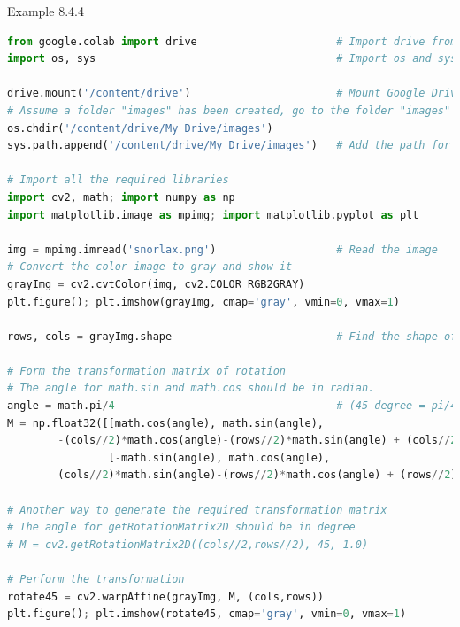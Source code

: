 \documentclass{book}
\begin{document}
\begin{egBox}{Example 8.4.4}{}
    \raggedright
    \begin{lstlisting}[language=Python, basicstyle=\ttfamily\small, keywordstyle=\color{blue}, commentstyle=\color{forestgreen}, stringstyle=\color{red}, showstringspaces=false]
from google.colab import drive                      # Import drive from google.colab package
import os, sys                                      # Import os and sys modules

drive.mount('/content/drive')                       # Mount Google Drive
# Assume a folder "images" has been created, go to the folder "images"
os.chdir('/content/drive/My Drive/images')
sys.path.append('/content/drive/My Drive/images')   # Add the path for interpreter to search

# Import all the required libraries
import cv2, math; import numpy as np
import matplotlib.image as mpimg; import matplotlib.pyplot as plt

img = mpimg.imread('snorlax.png')                   # Read the image
# Convert the color image to gray and show it
grayImg = cv2.cvtColor(img, cv2.COLOR_RGB2GRAY)
plt.figure(); plt.imshow(grayImg, cmap='gray', vmin=0, vmax=1)

rows, cols = grayImg.shape                          # Find the shape of image

# Form the transformation matrix of rotation
# The angle for math.sin and math.cos should be in radian.
angle = math.pi/4                                   # (45 degree = pi/4 radian)
M = np.float32([[math.cos(angle), math.sin(angle), 
        -(cols//2)*math.cos(angle)-(rows//2)*math.sin(angle) + (cols//2)], 
                [-math.sin(angle), math.cos(angle), 
        (cols//2)*math.sin(angle)-(rows//2)*math.cos(angle) + (rows//2)]])
        
# Another way to generate the required transformation matrix
# The angle for getRotationMatrix2D should be in degree
# M = cv2.getRotationMatrix2D((cols//2,rows//2), 45, 1.0)

# Perform the transformation
rotate45 = cv2.warpAffine(grayImg, M, (cols,rows))
plt.figure(); plt.imshow(rotate45, cmap='gray', vmin=0, vmax=1)


\end{lstlisting}
\end{egBox}
\end{document}
